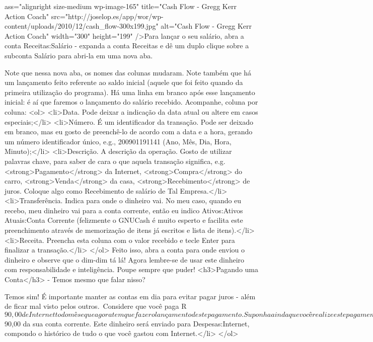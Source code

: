ass="alignright size-medium wp-image-165" title="Cash Flow - Gregg Kerr Action Coach" src="http://joselop.es/app/wor/wp-content/uploads/2010/12/cash_flow-300x199.jpg" alt="Cash Flow - Gregg Kerr Action Coach" width="300" height="199" />Para lançar o seu salário, abra a conta Receitas:Salário - expanda a conta Receitas e dê um duplo clique sobre a subconta Salário para abri-la em uma nova aba.

Note que nessa nova aba, os nomes das colunas mudaram. Note também que há um lançamento feito referente ao saldo inicial (aquele que foi feito quando da primeira utilização do programa). Há uma linha em branco após esse lançamento inicial: é aí que faremos o lançamento do salário recebido. Acompanhe, coluna por coluna:
<ol>
    <li>Data. Pode deixar a indicação da data atual ou altere em casos especiais;</li>
    <li>Número. É um identificador da transação. Pode ser deixado em branco, mas eu gosto de preenchê-lo de acordo com a data e a hora, gerando um número identificador único, e.g., 200901191141 (Ano, Mês, Dia, Hora, Minuto);</li>
    <li>Descrição. A descrição da operação. Gosto de utilizar palavras chave, para saber de cara o que aquela transação significa, e.g. <strong>Pagamento</strong> da Internet, <strong>Compra</strong> do carro, <strong>Venda</strong> da casa, <strong>Recebimento</strong> de juros. Coloque algo como Recebimento de salário de Tal Empresa.</li>
    <li>Transferência. Indica para onde o dinheiro vai. No meu caso, quando eu recebo, meu dinheiro vai para a conta corrente, então eu indico Ativos:Ativos Atuais:Conta Corrente (felizmente o GNUCash é muito esperto e facilita este preenchimento através de memorização de itens já escritos e lista de itens).</li>
    <li>Receita. Preencha esta coluna com o valor recebido e tecle Enter para finalizar a transação.</li>
</ol>
Feito isso, abra a conta para onde enviou o dinheiro e observe que o dim-dim tá lá! Agora lembre-se de usar este dinheiro com responsabilidade e inteligência. Poupe sempre que puder!
<h3>Pagando uma Conta</h3>
- Temos mesmo que falar nisso?

Temos sim! É importante manter as contas em dia para evitar pagar juros - além de ficar mal visto pelos outros. Considere que você paga R$ 90,00 de Internet todo mês e que agora tem que fazer o lançamento deste pagamento. Suponha ainda que você realize este pagamento da sua conta corrente, através do Internet Banking.
<ol>
    <li>Abra a sua conta corrente em uma nova aba.</li>
    <li>Na coluna Número, coloque o identificador da transação (opcional).</li>
    <li>Em Descrição, coloque algo como Pagamento da Internet.</li>
    <li>Em Transferência, indique Despesas:Internet.</li>
    <li>Em Saque, coloque 90 e tecle Enter.</li>
    <li>Feito isso, serão debitados R$ 90,00 da sua conta corrente. Este dinheiro será enviado para Despesas:Internet, compondo o histórico de tudo o que você gastou com Internet.</li>
</ol>

